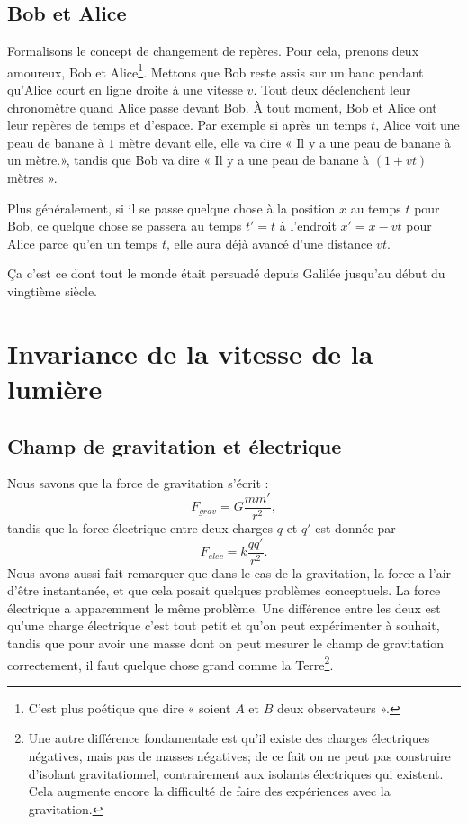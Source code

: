 \subsection{Bob et Alice}

Formalisons le concept de changement de repères. Pour cela, prenons deux amoureux, Bob et Alice\footnote{C'est plus poétique que dire « soient \( A\) et \( B\) deux observateurs ».}. Mettons que Bob reste assis sur un banc pendant qu'Alice court en ligne droite à une vitesse \( v\). Tout deux déclenchent leur chronomètre quand Alice passe devant Bob. À tout moment, Bob et Alice ont leur repères de temps et d'espace. Par exemple si après un temps \( t\), Alice voit une peau de banane à \( 1\) mètre devant elle, elle va dire « Il y a une peau de banane à un mètre.», tandis que Bob va dire « Il y a une peau de banane à \( (1+vt)\) mètres ».

Plus généralement, si il se passe quelque chose à la position \( x\) au temps \( t\) pour Bob, ce quelque chose se passera au temps \( t'=t\) à l'endroit \( x'=x-vt\) pour Alice parce qu'en un temps \( t\), elle aura déjà avancé d'une distance \( vt\).

Ça c'est ce dont tout le monde était persuadé depuis Galilée jusqu'au début du vingtième siècle.

%
\section{Invariance de la vitesse de la lumière}
%

\subsection{Champ de gravitation et électrique}

Nous savons que la force de gravitation s'écrit :
\[
	F_{grav}=G\frac{ mm' }{ r^2 },
\]
tandis que la force électrique entre deux charges \( q\) et \( q'\) est donnée par
\begin{equation}	\label{EqRappelFelec}
	F_{elec}=k\frac{ qq' }{ r^2 }.
\end{equation}
Nous avons aussi fait remarquer que dans le cas de la gravitation, la force a l'air d'être instantanée, et que cela posait quelques problèmes conceptuels. La force électrique a apparemment le même problème. Une différence entre les deux est qu'une charge électrique c'est tout petit et qu'on peut expérimenter à souhait, tandis que pour avoir une masse dont on peut mesurer le champ de gravitation correctement, il faut quelque chose grand comme la Terre\footnote{Une autre différence fondamentale est qu'il existe des charges électriques négatives, mais pas de masses négatives; de ce fait on ne peut pas construire d'isolant gravitationnel, contrairement aux isolants électriques qui existent. Cela augmente encore la difficulté de faire des expériences avec la gravitation.}.

